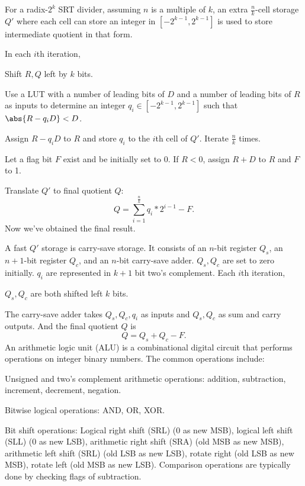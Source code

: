 \documentclass[a4paper,12pt]{report}
\begin{document}
For a radix-$2^k$ SRT divider, assuming $n$ is a multiple of $k$, an extra $\frac{n}{k}$-cell storage $Q'$ where each cell can store an integer in $[-2^{k-1},2^{k-1}]$ is used to store intermediate quotient in that form. 

In each $i$th iteration,
\ben
\item Shift ${R,Q}$ left by $k$ bits.
\item Use a LUT with a number of leading bits of $D$ and a number of leading bits of $R$ as inputs to determine an integer $q_i\in[-2^{k-1},2^{k-1}]$ such that $\abs{R-q_iD}<D$.
\item Assign $R-q_iD$ to $R$ and store $q_i$ to the $i$th cell of $Q'$.
\een
Iterate $\frac{n}{k}$ times.

Let a flag bit $F$ exist and be initially set to 0. If $R<0$, assign $R+D$ to $R$ and $F$ to 1.

Translate $Q'$ to final quotient $Q$:
\[Q=\sum_{i=1}^{\frac{n}{k}}q_i*2^{i-1}-F.\]
Now we've obtained the final result.

A fast $Q'$ storage is carry-save storage. It consists of an $n$-bit register $Q_s$, an $n+1$-bit register $Q_c$, and an $n$-bit carry-save adder. $Q_s,Q_c$ are set to zero initially. $q_i$ are represented in $k+1$ bit two's complement. Each $i$th iteration,
\ben
\item $Q_s,Q_c$ are both shifted left $k$ bits.
\item The carry-save adder takes $Q_s,Q_c,q_i$ as inputs and $Q_s,Q_c$ as sum and carry outputs.
\een
And the final quotient $Q$ is
\[Q=Q_s+Q_c-F.\]
An arithmetic logic unit (ALU) is a combinational digital circuit that performs operations on integer binary numbers. The common operations include:
\bit
\item Unsigned and two's complement arithmetic operations: addition, subtraction, increment, decrement, negation.
\item Bitwise logical operations: AND, OR, XOR.
\item Bit shift operations: Logical right shift (SRL) (0 as new MSB), logical left shift (SLL) (0 as new LSB), arithmetic right shift (SRA) (old MSB as new MSB), arithmetic left shift (SRL) (old LSB as new LSB), rotate right (old LSB as new MSB), rotate left (old MSB as new LSB).
\eit
Comparison operations are typically done by checking flags of subtraction.
\end{document}
